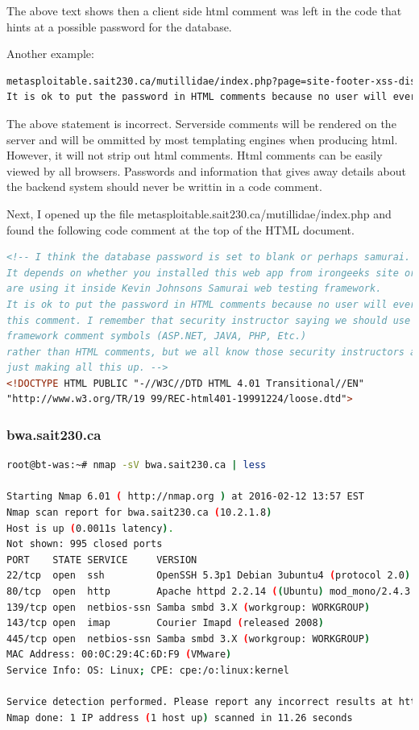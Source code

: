 \documentclass{article}
\begin{document}
The above text shows then a client side html comment was left in the code that hints at a possible password for the database.

Another example:

\begin{lstlisting}[language=Bash]
metasploitable.sait230.ca/mutillidae/index.php?page=site-footer-xss-discussion.php:5: \
It is ok to put the password in HTML comments because no user will ever see 
\end{lstlisting}

The above statement is incorrect. Serverside comments will be rendered on the server
and will be ommitted by most templating engines when producing html. However, it will
not strip out html comments. Html comments can be easily viewed by all browsers. Passwords
and information that gives away details about the backend system should never be
writtin in a code comment.

Next, I opened up the file metasploitable.sait230.ca/mutillidae/index.php and 
found the following code comment at the top of the HTML document.

\begin{lstlisting}[language=HTML]
<!-- I think the database password is set to blank or perhaps samurai.
It depends on whether you installed this web app from irongeeks site or
are using it inside Kevin Johnsons Samurai web testing framework. 
It is ok to put the password in HTML comments because no user will ever see 
this comment. I remember that security instructor saying we should use the
framework comment symbols (ASP.NET, JAVA, PHP, Etc.) 
rather than HTML comments, but we all know those security instructors are 
just making all this up. -->
<!DOCTYPE HTML PUBLIC "-//W3C//DTD HTML 4.01 Transitional//EN" 
"http://www.w3.org/TR/19 99/REC-html401-19991224/loose.dtd">
\end{lstlisting}

\subsubsection{bwa.sait230.ca}

\begin{lstlisting}[language=bash]
root@bt-was:~# nmap -sV bwa.sait230.ca | less

Starting Nmap 6.01 ( http://nmap.org ) at 2016-02-12 13:57 EST
Nmap scan report for bwa.sait230.ca (10.2.1.8)
Host is up (0.0011s latency).
Not shown: 995 closed ports
PORT    STATE SERVICE     VERSION
22/tcp  open  ssh         OpenSSH 5.3p1 Debian 3ubuntu4 (protocol 2.0)
80/tcp  open  http        Apache httpd 2.2.14 ((Ubuntu) mod_mono/2.4.3 PHP/5.3.2-1ubuntu4.5 with Suhosin-Patch mod_python/3.3.1 Python/2.6.5 mod_perl/2.0.4 Perl/v5.10.1)
139/tcp open  netbios-ssn Samba smbd 3.X (workgroup: WORKGROUP)
143/tcp open  imap        Courier Imapd (released 2008)
445/tcp open  netbios-ssn Samba smbd 3.X (workgroup: WORKGROUP)
MAC Address: 00:0C:29:4C:6D:F9 (VMware)
Service Info: OS: Linux; CPE: cpe:/o:linux:kernel

Service detection performed. Please report any incorrect results at http://nmap.org/submit/ .
Nmap done: 1 IP address (1 host up) scanned in 11.26 seconds
\end{lstlisting}
\end{document}
